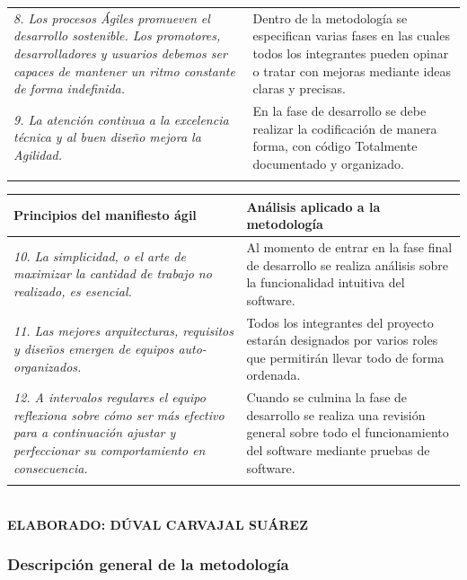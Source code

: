 \begin{table}[h!]
\begin{tabular}{p{7cm}p{7cm}}
		\addlinespace
		\textit{8. Los procesos Ágiles promueven el desarrollo sostenible. Los promotores, desarrolladores y usuarios debemos ser capaces de mantener un ritmo constante de forma indefinida.}  & Dentro de la metodología se especifican varias fases en las cuales todos los integrantes pueden opinar o tratar con mejoras mediante ideas claras y precisas. \\
		\addlinespace
		\textit{9. La atención continua a la excelencia técnica y al buen diseño mejora la Agilidad.} & En la fase de desarrollo se debe realizar la codificación de manera forma, con código Totalmente documentado y organizado. \\
		\addlinespace
		\bottomrule
	\end{tabular}
	
\end{table}

\begin{table}
	\begin{tabular}{p{7cm}p{7cm}}
		\toprule
		\textbf{Principios del manifiesto ági}l & \textbf{Análisis aplicado a la metodología} \\
		\midrule
		\textit{10. La simplicidad, o el arte de maximizar la cantidad de trabajo no realizado, es esencial.} & Al momento de entrar en la fase final de desarrollo se realiza análisis sobre la funcionalidad intuitiva del software. \\
		\addlinespace
		\textit{11. Las mejores arquitecturas, requisitos y diseños emergen de equipos auto-organizados.} & Todos los integrantes del proyecto estarán designados por varios roles que permitirán llevar todo de forma ordenada. \\
		\addlinespace
		\textit{12. A intervalos regulares el equipo reflexiona sobre cómo ser más efectivo para a continuación ajustar y perfeccionar su comportamiento en consecuencia. } & Cuando se culmina la fase de desarrollo se realiza una revisión general sobre todo el funcionamiento del software mediante pruebas de software. \\
		\addlinespace
		\bottomrule
	\end{tabular}
	
	\textbf{ \\ ELABORADO: DÚVAL CARVAJAL SUÁREZ}
\end{table}

\subsubsection{Descripción general de la metodología}

